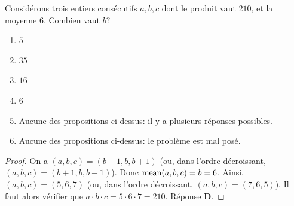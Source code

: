 % 
%
Considérons trois entiers consécutifs $a, b, c$ dont le produit vaut $210$, et la moyenne $6$. Combien vaut $b$?
%
\begin{enumerate}
  \item $5$
  \item $35$
  \item $16$
  \item $6$
  \item Aucune des propositions ci-dessus: il y a plusieurs réponses possibles.
  \item Aucune des propositions ci-dessus: le problème est mal posé.
\end{enumerate}
%
\begin{proof}
On a $(a, b, c) = (b-1, b, b+1)$ (ou, dans l'ordre décroissant, $(a, b, c) = (b+1, b, b-1)$). Donc %
$\operatorname{mean}(a, b, c) = b = 6$. Ainsi, $(a, b, c) = (5, 6, 7)$ (ou, dans l'ordre décroissant, $(a, b, c) = (7, 6, 5)$). %
Il faut alors vérifier que $a\cdot b \cdot c= 5\cdot 6 \cdot 7= 210$. Réponse \textbf{D}.
\end{proof}